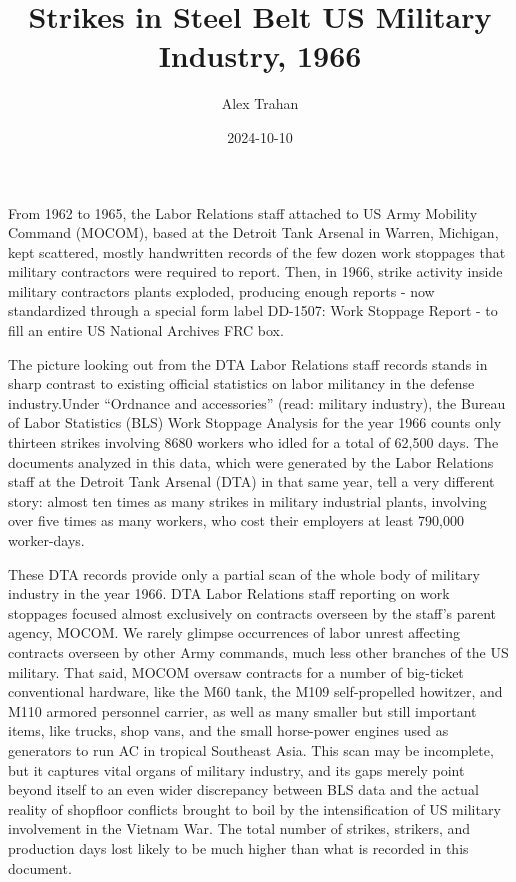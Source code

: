 \documentclass[
]{article}
\title{Strikes in Steel Belt US Military Industry, 1966}
\author{Alex Trahan}
\date{2024-10-10}
\begin{document}
\maketitle

From 1962 to 1965, the Labor Relations staff attached to US Army
Mobility Command (MOCOM), based at the Detroit Tank Arsenal in Warren,
Michigan, kept scattered, mostly handwritten records of the few dozen
work stoppages that military contractors were required to report. Then,
in 1966, strike activity inside military contractors plants exploded,
producing enough reports - now standardized through a special form label
DD-1507: Work Stoppage Report - to fill an entire US National Archives
FRC box.

The picture looking out from the DTA Labor Relations staff records
stands in sharp contrast to existing official statistics on labor
militancy in the defense industry.Under ``Ordnance and accessories''
(read: military industry), the Bureau of Labor Statistics (BLS) Work
Stoppage Analysis for the year 1966 counts only thirteen strikes
involving 8680 workers who idled for a total of 62,500 days. The
documents analyzed in this data, which were generated by the Labor
Relations staff at the Detroit Tank Arsenal (DTA) in that same year,
tell a very different story: almost ten times as many strikes in
military industrial plants, involving over five times as many workers,
who cost their employers at least 790,000 worker-days.

These DTA records provide only a partial scan of the whole body of
military industry in the year 1966. DTA Labor Relations staff reporting
on work stoppages focused almost exclusively on contracts overseen by
the staff's parent agency, MOCOM. We rarely glimpse occurrences of labor
unrest affecting contracts overseen by other Army commands, much less
other branches of the US military. That said, MOCOM oversaw contracts
for a number of big-ticket conventional hardware, like the M60 tank, the
M109 self-propelled howitzer, and M110 armored personnel carrier, as
well as many smaller but still important items, like trucks, shop vans,
and the small horse-power engines used as generators to run AC in
tropical Southeast Asia. This scan may be incomplete, but it captures
vital organs of military industry, and its gaps merely point beyond
itself to an even wider discrepancy between BLS data and the actual
reality of shopfloor conflicts brought to boil by the intensification of
US military involvement in the Vietnam War. The total number of strikes,
strikers, and production days lost likely to be much higher than what is
recorded in this document.
\end{document}
